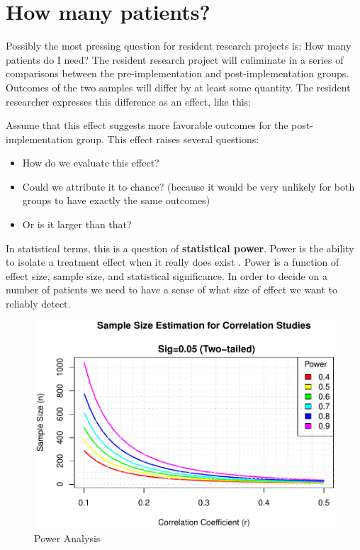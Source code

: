 \documentclass[
]{report}
\providecommand{\tightlist}{%
  \setlength{\itemsep}{0pt}\setlength{\parskip}{0pt}}
\begin{document}
\hypertarget{how-many-patients}{%
\section{How many patients?}\label{how-many-patients}}

Possibly the most pressing question for resident research projects is:
How many patients do I need? The resident research project will
culiminate in a series of comparisons between the pre-implementation and
post-implementation groups. Outcomes of the two samples will differ by
at least some quantity. The resident researcher expresses this
difference as an effect, like this:

Assume that this effect suggests more favorable outcomes for the
post-implementation group. This effect raises several questions:

\begin{itemize}
\tightlist
\item
  How do we evaluate this effect?
\item
  Could we attribute it to chance? (because it would be very unlikely
  for both groups to have exactly the same outcomes)
\item
  Or is it larger than that?
\end{itemize}

In statistical terms, this is a question of \textbf{statistical power}.
Power is the ability to isolate a treatment effect when it really does
exist \citep{Cohen1988}. Power is a function of effect size, sample
size, and statistical significance. In order to decide on a number of
patients we need to have a sense of what size of effect we want to
reliably detect.

\begin{figure}
\centering
\includegraphics{index_files/figure-latex/power-1.pdf}
\caption{Power Analysis}
\end{figure}
\end{document}
